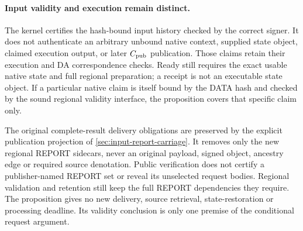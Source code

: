 \paragraph{Input validity and execution remain distinct.}
The kernel certifies the hash-bound input history checked by the
correct signer. It does not authenticate an arbitrary unbound native
context, supplied state object, claimed execution output, or later
$C_{\rm pub}$ publication. Those claims retain their execution and DA
correspondence checks. Ready still requires the exact usable native
state and full regional preparation; a receipt is not an executable
state object. If a particular native claim is itself bound by the DATA
hash and checked by the sound regional validity interface, the
proposition covers that specific claim only.

The original complete-result delivery obligations are preserved by the
explicit publication projection of \cref{sec:input-report-carriage}. It removes
only the new regional REPORT sidecars, never an original payload, signed
object, ancestry edge or required source denotation. Public verification
does not certify a publisher-named REPORT set or reveal its unselected
request bodies. Regional validation and retention still keep the full
REPORT dependencies they require. The proposition gives no new delivery,
source retrieval, state-restoration or processing deadline. Its validity
conclusion is only one premise of the conditional request argument.
